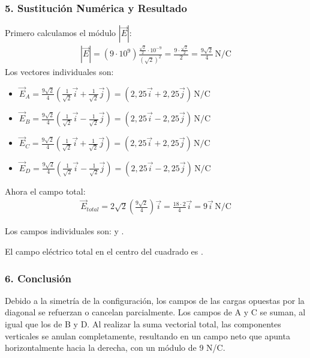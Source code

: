 \subsubsection*{5. Sustitución Numérica y Resultado}
Primero calculamos el módulo $|\vec{E}|$:
\begin{gather}
    |\vec{E}| = (9\cdot10^9) \frac{\frac{\sqrt{2}}{2}\cdot10^{-9}}{(\sqrt{2})^2} = \frac{9\cdot\frac{\sqrt{2}}{2}}{2} = \frac{9\sqrt{2}}{4} \, \text{N/C}
\end{gather}
Los vectores individuales son:
\begin{itemize}
    \item $\vec{E}_A = \frac{9\sqrt{2}}{4}(\frac{1}{\sqrt{2}}\vec{i} + \frac{1}{\sqrt{2}}\vec{j}) = (2,25\vec{i} + 2,25\vec{j}) \, \text{N/C}$
    \item $\vec{E}_B = \frac{9\sqrt{2}}{4}(\frac{1}{\sqrt{2}}\vec{i} - \frac{1}{\sqrt{2}}\vec{j}) = (2,25\vec{i} - 2,25\vec{j}) \, \text{N/C}$
    \item $\vec{E}_C = \frac{9\sqrt{2}}{4}(\frac{1}{\sqrt{2}}\vec{i} + \frac{1}{\sqrt{2}}\vec{j}) = (2,25\vec{i} + 2,25\vec{j}) \, \text{N/C}$
    \item $\vec{E}_D = \frac{9\sqrt{2}}{4}(\frac{1}{\sqrt{2}}\vec{i} - \frac{1}{\sqrt{2}}\vec{j}) = (2,25\vec{i} - 2,25\vec{j}) \, \text{N/C}$
\end{itemize}
Ahora el campo total:
\begin{gather}
    \vec{E}_{total} = 2\sqrt{2} \left( \frac{9\sqrt{2}}{4} \right) \vec{i} = \frac{18 \cdot 2}{4} \vec{i} = 9 \vec{i} \, \text{N/C}
\end{gather}
\begin{cajaresultado}
    Los campos individuales son:
     y
    .
\end{cajaresultado}
\begin{cajaresultado}
    El campo eléctrico total en el centro del cuadrado es .
\end{cajaresultado}

\subsubsection*{6. Conclusión}
\begin{cajaconclusion}
Debido a la simetría de la configuración, los campos de las cargas opuestas por la diagonal se refuerzan o cancelan parcialmente. Los campos de A y C se suman, al igual que los de B y D. Al realizar la suma vectorial total, las componentes verticales se anulan completamente, resultando en un campo neto que apunta horizontalmente hacia la derecha, con un módulo de 9 N/C.
\end{cajaconclusion}

